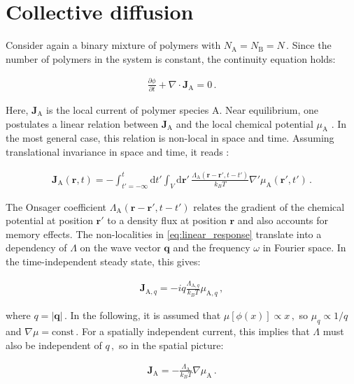 \documentclass[bachelor,       %
               twoside,        %
               BCOR10mm,       %
               ngerman, english %
               ]{GAUBM}
\begin{document}
\section{Collective diffusion}

Consider again a binary mixture of polymers with $N_\mathrm A=N_\mathrm B=N\,$. Since the number of polymers in the system is constant, the continuity equation holds:

\begin{align}
  \frac{\partial\phi}{\partial t}+\nabla\cdot\mathbf{J}_\mathrm A=0\,.
  \label{eq:conti}
\end{align}

Here, $\mathbf{J}_\mathrm A$ is the local current of polymer species A. Near equilibrium, one postulates a linear relation between $\mathbf{J}_\mathrm A$ and the local chemical potential $\mu_\mathrm A$ \cite{deGennes80}. In the most general case, this relation is non-local in space and time. Assuming translational invariance in space and time, it reads \cite{erukhimovich1986nonexponential}:


\begin{align}
    \mathbf{J}_\mathrm A(\mathbf{r},t)=-\int_{t'=-\infty}^t\mathrm d t'\int_V\mathrm d \mathbf{r'}\,\frac{\Lambda_\mathrm A(\mathbf{r}- \mathbf{r'},t-t')}{k_BT}\nabla '\mu_\mathrm A(\mathbf{r'},t')\,.
    \label{eq:linear_response}
\end{align}

The Onsager coefficient $\Lambda_\mathrm{A}(\mathbf{r}- \mathbf{r'},t-t')$ relates the gradient of the chemical potential at position $\mathbf{r'}$ to a density flux at position $\mathbf r$ and also accounts for memory effects. The non-localities in \eqref{eq:linear_response} translate into a dependency of $\Lambda$ on the wave vector $\mathbf q$ and the frequency $\omega$ in Fourier space. In the time-independent steady state, this gives:


\begin{align}
    \mathbf {J}_{\mathrm A, q}=-iq\frac{\Lambda_{\mathrm A, q}}{k_BT}\mu_{\mathrm A, q}\,,
\end{align}

where $q=|\mathbf q|\,.$ In the following, it is assumed that $\mu[\phi(x)]\propto x\,,$ so $\mu_q\propto 1/q$ and $\nabla\mu=\mathrm{const}\,.$ For a spatially independent current, this implies that $\Lambda$ must also be independent of $q\,,$ so in the spatial picture: 


\begin{align}
    \mathbf {J}_\mathrm A=-\frac{\Lambda_\mathrm A}{k_BT}\nabla\mu_\mathrm A\,.
    \label{eq:current_local}
\end{align}
\end{document}
